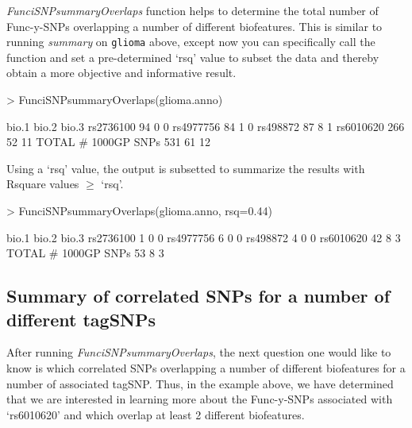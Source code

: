 \documentclass[12pt,fullpage]{article}
\newcommand{\Robject}[1]{{\texttt{#1}}}
\newcommand{\Rmethod}[1]{{\textit{#1}}}
\begin{document}
\Rmethod{FunciSNPsummaryOverlaps} function helps to determine the
total number of Func-y-SNPs overlapping a number of different biofeatures. This
is similar to running \Rmethod{summary} on \Robject{glioma} above, except now
you can specifically call the function and set a pre-determined `rsq' value to
subset the data and thereby obtain a more objective and informative result.

\begin{Schunk}
\begin{Sinput}
> FunciSNPsummaryOverlaps(glioma.anno)
\end{Sinput}
\begin{Soutput}
                    bio.1 bio.2 bio.3
rs2736100              94     0     0
rs4977756              84     1     0
rs498872               87     8     1
rs6010620             266    52    11
TOTAL # 1000GP SNPs   531    61    12
\end{Soutput}
\end{Schunk}

Using a `rsq' value, the output is subsetted to summarize the results with 
Rsquare values $\ge$ `rsq'.

\begin{Schunk}
\begin{Sinput}
> FunciSNPsummaryOverlaps(glioma.anno, rsq=0.44)
\end{Sinput}
\begin{Soutput}
                    bio.1 bio.2 bio.3
rs2736100               1     0     0
rs4977756               6     0     0
rs498872                4     0     0
rs6010620              42     8     3
TOTAL # 1000GP SNPs    53     8     3
\end{Soutput}
\end{Schunk}

\subsection{Summary of correlated SNPs for a number of different tagSNPs}

After running \Rmethod{FunciSNPsummaryOverlaps}, the next question one would
like to know is which correlated SNPs overlapping a number of different
biofeatures for a number of associated tagSNP. Thus, in the example above, we
have determined that we are interested in learning more about the Func-y-SNPs
associated with `rs6010620' and which overlap at least 2 different biofeatures.
\end{document}
